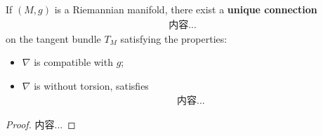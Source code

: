 \documentclass[Total.tex]{subfiles}
\begin{document}
	\begin{proposition}
		If $(M,g)$ is a Riemannian manifold, there exist a \textbf{unique connection}
		\begin{gather*}
			内容...
		\end{gather*}
		on the tangent bundle $T_M$ satisfying the properties:
		\begin{itemize}
			\item $\nabla$ is compatible with $g$;
			\item $\nabla$ is without torsion, satisfies
			\begin{gather*}
				内容...
			\end{gather*}
		\end{itemize}
	\end{proposition}
	\begin{proof}
		内容...
	\end{proof}
\end{document}
